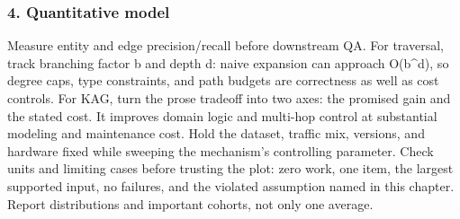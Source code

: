 \subsubsection*{4. Quantitative model}
Measure entity and edge precision/recall before downstream QA. For traversal, track branching factor b and depth d: naive expansion can approach O(b\textasciicircum{}d), so degree caps, type constraints, and path budgets are correctness as well as cost controls.
For KAG, turn the prose tradeoff into two axes: the promised gain and the stated cost. It improves domain logic and multi-hop control at substantial modeling and maintenance cost. Hold the dataset, traffic mix, versions, and hardware fixed while sweeping the mechanism's controlling parameter.
Check units and limiting cases before trusting the plot: zero work, one item, the largest supported input, no failures, and the violated assumption named in this chapter. Report distributions and important cohorts, not only one average.
